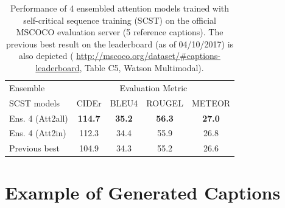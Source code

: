\documentclass[10pt,twocolumn,letterpaper]{article}
\begin{document}
\begin{table}[th]
\small\addtolength{\tabcolsep}{-0.0pt} 
\begin{tabular}{l|cccc}
\hline \hline
Ensemble  & \multicolumn{4}{c}{Evaluation Metric} \\
 SCST models & CIDEr & BLEU4 & ROUGEL & METEOR  \\
\hline
Ens. 4 (Att2all) & \bf{114.7} & \bf{35.2} & \bf{56.3} & \bf{27.0} \\
Ens. 4 (Att2in) & {112.3} & {34.4}  & {55.9} & {26.8}  \\ 
Previous best & 104.9 & 34.3 & 55.2 & 26.6 \\
\hline \hline
\end{tabular}
\caption{Performance of 4 ensembled attention models trained with self-critical sequence training (SCST) on the official MSCOCO evaluation server (5 reference captions). The previous best result on the leaderboard (as of 04/10/2017) is also depicted ( \href{http://mscoco.org/dataset/\#captions-leaderboard}{http://mscoco.org/dataset/\#captions-leaderboard}, Table C5, Watson Multimodal).}
\label{tab:serverresults}
\end{table}
\vspace{-0.1in}

\section{Example of Generated Captions}\label{Sec:Example}

\end{document}
